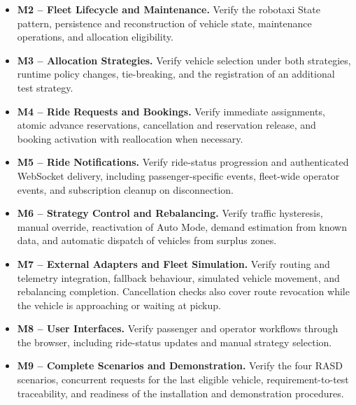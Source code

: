 \documentclass[11pt,a4paper,oneside]{report}
\begin{document}
\begin{description}
\begin{itemize}
        \item \textbf{M2 -- Fleet Lifecycle and Maintenance.}
        Verify the robotaxi State pattern, persistence and
        reconstruction of vehicle state, maintenance operations,
        and allocation eligibility.

        \item \textbf{M3 -- Allocation Strategies.}
        Verify vehicle selection under both strategies, runtime policy
        changes, tie-breaking, and the registration of an additional
        test strategy.

        \item \textbf{M4 -- Ride Requests and Bookings.}
        Verify immediate assignments, atomic advance reservations,
        cancellation and reservation release, and booking activation
        with reallocation when necessary.

        \item \textbf{M5 -- Ride Notifications.}
        Verify ride-status progression and authenticated WebSocket
        delivery, including passenger-specific events, fleet-wide
        operator events, and subscription cleanup on disconnection.

        \item \textbf{M6 -- Strategy Control and Rebalancing.}
        Verify traffic hysteresis, manual override, reactivation of
        Auto Mode, demand estimation from known data, and automatic
        dispatch of vehicles from surplus zones.

        \item \textbf{M7 -- External Adapters and Fleet Simulation.}
        Verify routing and telemetry integration, fallback behaviour,
        simulated vehicle movement, and rebalancing completion.
        Cancellation checks also cover route revocation while the
        vehicle is approaching or waiting at pickup.

        \item \textbf{M8 -- User Interfaces.}
        Verify passenger and operator workflows through the browser,
        including ride-status updates and manual strategy selection.

        \item \textbf{M9 -- Complete Scenarios and Demonstration.}
        Verify the four RASD scenarios, concurrent requests for the
        last eligible vehicle, requirement-to-test traceability, and
        readiness of the installation and demonstration procedures.
    \end{itemize}


\end{description}
\end{document}
